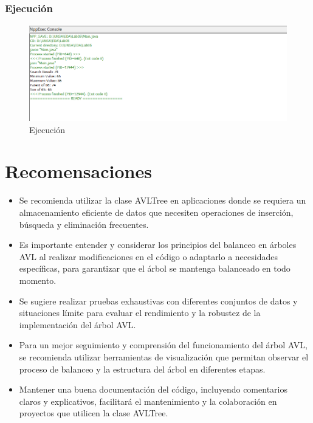 \documentclass{article}
\begin{document}

  \subsubsection{Ejecución}
  \begin{figure}[H]
    \centering
    \includegraphics[width=1\textwidth, keepaspectratio]{img/ejemain.png}
    \caption{Ejecución}
  \end{figure}
  

  \section{Recomensaciones}
  \begin{itemize}
    \item Se recomienda utilizar la clase AVLTree en aplicaciones donde se requiera un almacenamiento eficiente de datos que necesiten operaciones de inserción, búsqueda y eliminación frecuentes.
    \item Es importante entender y considerar los principios del balanceo en árboles AVL al realizar modificaciones en el código o adaptarlo a necesidades específicas, para garantizar que el árbol se mantenga balanceado en todo momento.
    \item Se sugiere realizar pruebas exhaustivas con diferentes conjuntos de datos y situaciones límite para evaluar el rendimiento y la robustez de la implementación del árbol AVL.
    \item Para un mejor seguimiento y comprensión del funcionamiento del árbol AVL, se recomienda utilizar herramientas de visualización que permitan observar el proceso de balanceo y la estructura del árbol en diferentes etapas.
    \item Mantener una buena documentación del código, incluyendo comentarios claros y explicativos, facilitará el mantenimiento y la colaboración en proyectos que utilicen la clase AVLTree.
  \end{itemize}
\end{document}
